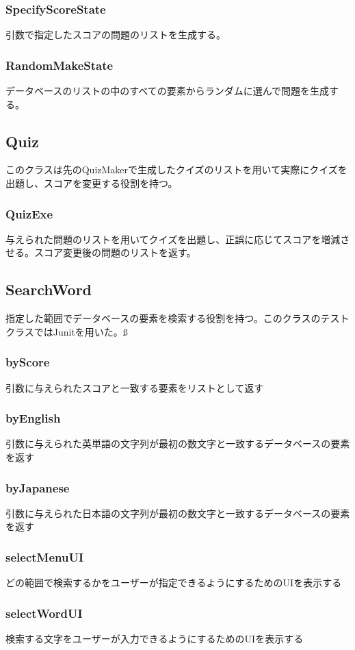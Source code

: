 \documentclass{ltjsarticle}
\begin{document}
\subsubsection{SpecifyScoreState}
引数で指定したスコアの問題のリストを生成する。
\subsubsection{RandomMakeState}
データベースのリストの中のすべての要素からランダムに選んで問題を生成する。

\subsection{Quiz}
このクラスは先のQuizMakerで生成したクイズのリストを用いて実際にクイズを出題し、スコアを変更する役割を持つ。
\subsubsection{QuizExe}
与えられた問題のリストを用いてクイズを出題し、正誤に応じてスコアを増減させる。スコア変更後の問題のリストを返す。

\subsection{SearchWord}
指定した範囲でデータベースの要素を検索する役割を持つ。このクラスのテストクラスではJunitを用いた。ß
\subsubsection{byScore}
引数に与えられたスコアと一致する要素をリストとして返す
\subsubsection{byEnglish}
引数に与えられた英単語の文字列が最初の数文字と一致するデータベースの要素を返す
\subsubsection{byJapanese}
引数に与えられた日本語の文字列が最初の数文字と一致するデータベースの要素を返す
\subsubsection{selectMenuUI}
どの範囲で検索するかをユーザーが指定できるようにするためのUIを表示する
\subsubsection{selectWordUI}
検索する文字をユーザーが入力できるようにするためのUIを表示する
\end{document}

